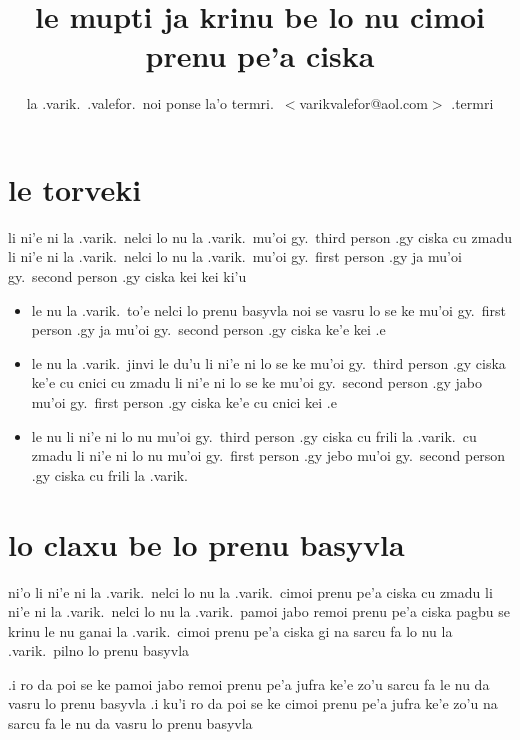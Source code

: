 \documentclass{article}
\title{le mupti ja krinu be lo nu cimoi prenu pe'a ciska}
\author{la .varik.\ .valefor.\ noi ponse la'o termri.\ $<$varikvalefor@aol.com$>$ .termri}
\begin{document}
\maketitle

\section{le torveki}
li ni'e ni la .varik.\ nelci lo nu la .varik.\ mu'oi gy.\ third person .gy ciska cu zmadu li ni'e ni la .varik.\ nelci lo nu la .varik.\ mu'oi gy.\ first person .gy ja mu'oi gy.\ second person .gy ciska kei kei ki'u
\begin{itemize}
	\item le nu la .varik.\ to'e nelci lo prenu basyvla noi se vasru lo se ke mu'oi gy.\ first person .gy ja mu'oi gy.\ second person .gy ciska ke'e kei .e
	\item le nu la .varik.\ jinvi le du'u li ni'e ni lo se ke mu'oi gy.\ third person .gy ciska ke'e cu cnici cu zmadu li ni'e ni lo se ke mu'oi gy.\ second person .gy jabo mu'oi gy.\ first person .gy ciska ke'e cu cnici kei .e
	\item le nu li ni'e ni lo nu mu'oi gy.\ third person .gy ciska cu frili la .varik.\ cu zmadu li ni'e ni lo nu mu'oi gy.\ first person .gy jebo mu'oi gy.\ second person .gy ciska cu frili la .varik.
\end{itemize}

\section{lo claxu be lo prenu basyvla}
ni'o li ni'e ni la .varik.\ nelci lo nu la .varik.\ cimoi prenu pe'a ciska cu zmadu li ni'e ni la .varik.\ nelci lo nu la .varik.\ pamoi jabo remoi prenu pe'a ciska pagbu se krinu le nu ganai la .varik.\ cimoi prenu pe'a ciska gi na sarcu fa lo nu la .varik.\ pilno lo prenu basyvla

.i ro da poi se ke pamoi jabo remoi prenu pe'a jufra ke'e zo'u sarcu fa le nu da vasru lo prenu basyvla  .i ku'i ro da poi se ke cimoi prenu pe'a jufra ke'e zo'u na sarcu fa le nu da vasru lo prenu basyvla
\end{document}
